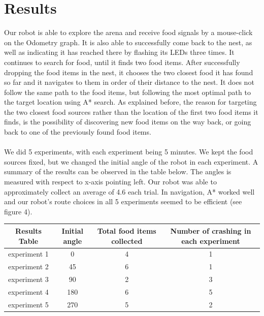 \documentclass[]{article}
\begin{document}

\section{Results}
Our robot is able to explore the arena and receive food signals by a mouse-click on the Odometry graph. It is also able to successfully come back to the nest, as well as indicating it has reached there by flashing its LEDs three times. It continues to search for food, until it finds two food items. After successfully dropping the food items in the nest, it chooses the two closest food it has found so far and it navigates to them in order of their distance to the nest. It does not follow the same path to the food items, but following the most optimal path to the target location using A* search. As explained before, the reason for targeting the two closest food sources rather than the location of the first two food items it finds, is the possibility of discovering new food items on the way back, or going back to one of the previously found food items.\\\\
We did 5 experiments, with each experiment being 5 minutes. We kept the food sources fixed, but we changed the initial angle of the robot in each experiment. A summary of the results can be observed in the table below. The angles is measured with respect to x-axis pointing left. Our robot was able to approximately collect an average of 4.6 each trial. In navigation, A* worked well and our robot's route choices in all 5 experiments seemed to be efficient (see figure 4).

\begin{center}
\begin{tabular}{|c|c|c|c|}
 \hline
  \textbf{Results Table} & \textbf{Initial angle} & \textbf{Total food items collected} & \textbf{Number of crashing in each experiment} \\
 \hline
 experiment 1 & 0 & 4 & 1\\
 experiment 2 & 45 & 6 & 1\\
 experiment 3 & 90 & 2 & 3\\
 experiment 4 & 180 & 6 & 5\\
 experiment 5 & 270 & 5 & 2\\
 \hline
\end{tabular}

\end{center}
\end{document}
